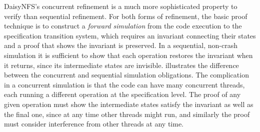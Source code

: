 DaisyNFS's concurrent refinement is a much more sophisticated property to verify
than sequential refinement. For both forms of refinement, the basic proof technique is to construct a
\emph{forward simulation} from the code execution to the specification
transition system, which requires an invariant connecting their states and a
proof that shows the invariant is preserved. In a sequential, non-crash
simulation it is sufficient to show that each operation restores the invariant
when it returns, since its intermediate states are invisible.
 illustrates the difference between the
concurrent and sequential simulation obligations. The complication in a
concurrent simulation is that the code can have many concurrent threads, each
running a different operation at the specification level. The
proof of any given operation must show the intermediate states satisfy the
invariant as well as the final one, since at any
time other threads might run, and similarly the proof must consider interference
from other threads at any time.

